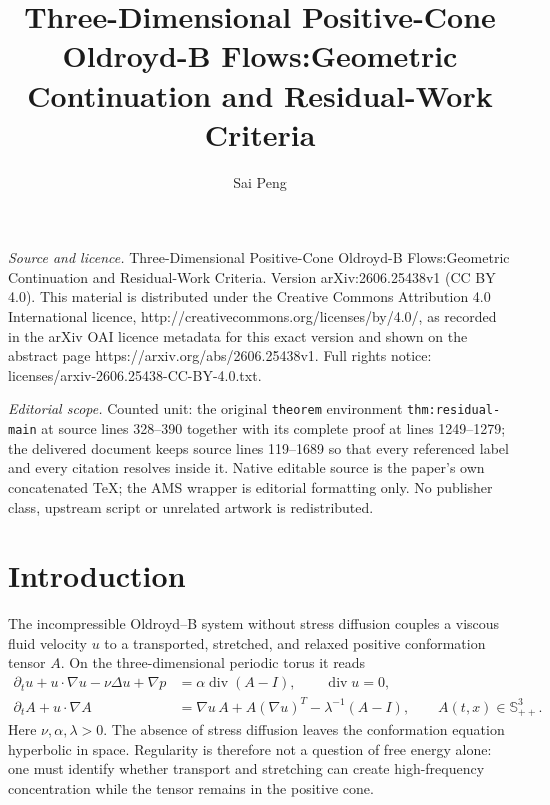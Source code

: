 \documentclass[10pt,a4paper]{amsart}
\numberwithin{equation}{section}
\newcommand{\Id}{I}
\newcommand{\Spp}{\mathbb S_{++}}
\newcommand{\divv}{\operatorname{div}}
\begin{document}
\title[Three-Dimensional Positive-Cone Oldroyd-B Flows:Geometric Co]{Three-Dimensional Positive-Cone Oldroyd-B Flows:Geometric Continuation and Residual-Work Criteria}
\author{Sai Peng}
\date{}
\maketitle
\noindent\emph{Source and licence.} Three-Dimensional Positive-Cone Oldroyd-B Flows:Geometric Continuation and Residual-Work Criteria. Version arXiv:2606.25438v1 (CC BY 4.0). This material is distributed under the Creative Commons Attribution 4.0 International licence, http://creativecommons.org/licenses/by/4.0/, as recorded in the arXiv OAI licence metadata for this exact version and shown on the abstract page https://arxiv.org/abs/2606.25438v1. Full rights notice: licenses/arxiv-2606.25438-CC-BY-4.0.txt.\par\smallskip
\noindent\textit{Editorial scope.} Counted unit: the original \texttt{theorem} environment \texttt{thm:residual-main} at source lines 328--390 together with its complete proof at lines 1249--1279; the delivered document keeps source lines 119--1689 so that every referenced label and every citation resolves inside it. Native editable source is the paper's own concatenated TeX; the AMS wrapper is editorial formatting only. No publisher class, upstream script or unrelated artwork is redistributed.
\section{Introduction}

The incompressible Oldroyd--B system without stress diffusion couples a viscous
fluid velocity \(u\) to a transported, stretched, and relaxed positive
conformation tensor \(A\).  On the three-dimensional periodic torus it reads
\begin{align}
  \partial_t u+u\cdot\nabla u-\nu\Delta u+\nabla p
  &=\alpha\divv(A-\Id),\qquad \divv u=0,
  \label{eq:momentum}\\
  \partial_t A+u\cdot\nabla A
  &=\nabla u\,A+A(\nabla u)^T-\lambda^{-1}(A-\Id),
  \qquad A(t,x)\in\Spp^3 .
  \label{eq:conf}
\end{align}
Here \(\nu,\alpha,\lambda>0\).  The absence of stress diffusion leaves the
conformation equation hyperbolic in space.  Regularity is therefore not a
question of free energy alone: one must identify whether transport and
stretching can create high-frequency concentration while the tensor remains in
the positive cone.
\end{document}
